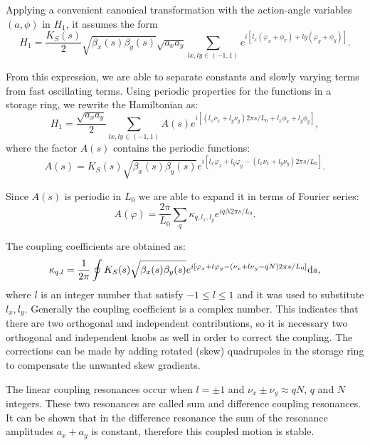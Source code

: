Applying a convenient canonical transformation with the action-angle variables $(a, \phi)$ in $H_1$, it assumes the form~\cite{wiedemann2007physics}
\begin{equation*}
    H_1 = \dfrac{K_S(s)}{2}\sqrt{\beta_x(s)\beta_y(s)} \sqrt{a_x a_y} \sum_{lx, ly \in (-1, 1)} e^{i\left[l_x(\varphi_x + \phi_x) + ly(\varphi_y + \phi_y)\right]}.
\end{equation*}

From this expression, we are able to separate constants and slowly varying terms from fast oscillating terms. Using periodic properties for the functions in a storage ring, we rewrite the Hamiltonian as:
\begin{equation*}
    H_1 = \dfrac{\sqrt{a_x a_y}}{2} \sum_{lx, ly \in (-1, 1)} A(s) e^{i\left[\left(l_x\nu_x + l_y\nu_y\right)2\pi s/L_0 + l_x\phi_x + l_y\phi_y\right]},
\end{equation*}
where the factor $A(s)$ contains the periodic functions:
\begin{equation*}
    A(s) = K_S(s) \sqrt{\beta_x(s) \beta_y(s)} e^{i\left[l_x\varphi_x + l_y\varphi_y - \left(l_x\nu_x + l_y\nu_y\right)2\pi s/L_0\right]}.
\end{equation*}

Since $A(s)$ is periodic in $L_0$ we are able to expand it in terms of Fourier series:
\begin{equation*}
    A(\varphi) = \dfrac{2\pi}{L_0} \sum_{q} \kappa_{q, l_x, l_y}e^{i q N 2 \pi s/L_0}.
\end{equation*}

The coupling coefficients are obtained as:
\begin{equation}
    \kappa_{q, l} = \dfrac{1}{2\pi} \oint K_S(s) \sqrt{\beta_x(s) \beta_y(s)} e^{i\left[\varphi_x + l\varphi_y - \left(\nu_x + l\nu_y - qN\right)2\pi s/L_0\right]}\mathrm{d} s,
\end{equation}
where $l$ is an integer number that satisfy $-1 \leq l \leq 1$ and it was used to substitute $l_x, l_y$. Generally the coupling coefficient is a complex number. This indicates that there are two orthogonal and independent contributions, so it is necessary two orthogonal and independent knobs as well in order to correct the coupling. The corrections can be made by adding rotated (skew) quadrupoles in the storage ring to compensate the unwanted skew gradients.

The linear coupling resonances occur when $l = \pm 1$ and $\nu_x \pm \nu_y \approx qN$, $q$ and $N$ integers. These two resonances are called sum and difference coupling resonances. It can be shown that in the difference resonance the sum of the resonance amplitudes $a_x + a_y$ is constant, therefore this coupled motion is stable.

